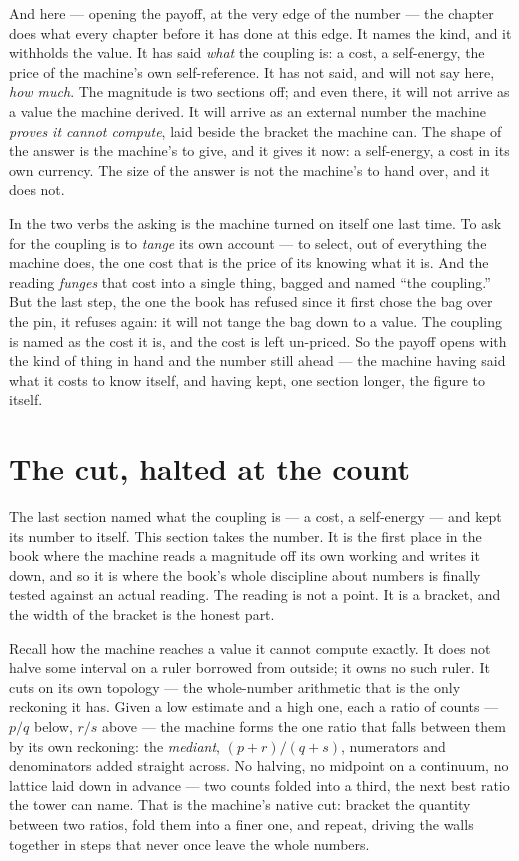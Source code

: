 And here --- opening the payoff, at the very edge of the number --- the chapter does what every chapter before it has
done at this edge. It names the kind, and it withholds the value. It has said \emph{what} the coupling is: a cost, a
self-energy, the price of the machine's own self-reference. It has not said, and will not say here, \emph{how much}.
The magnitude is two sections off; and even there, it will not arrive as a value the machine derived. It will arrive as
an external number the machine \emph{proves it cannot compute}, laid beside the bracket the machine can. The shape of
the answer is the machine's to give, and it gives it now: a self-energy, a cost in its own currency. The size of the
answer is not the machine's to hand over, and it does not.

In the two verbs the asking is the machine turned on itself one last time. To ask for the coupling is to \emph{tange}
its own account --- to select, out of everything the machine does, the one cost that is the price of its knowing what
it is. And the reading \emph{funges} that cost into a single thing, bagged and named ``the coupling.'' But the last
step, the one the book has refused since it first chose the bag over the pin, it refuses again: it will not tange the
bag down to a value. The coupling is named as the cost it is, and the cost is left un-priced. So the payoff opens with
the kind of thing in hand and the number still ahead --- the machine having said what it costs to know itself, and
having kept, one section longer, the figure to itself.

\section{The cut, halted at the count}

The last section named what the coupling is --- a cost, a self-energy --- and kept its number to itself. This section
takes the number. It is the first place in the book where the machine reads a magnitude off its own working and writes
it down, and so it is where the book's whole discipline about numbers is finally tested against an actual reading. The
reading is not a point. It is a bracket, and the width of the bracket is the honest part.

Recall how the machine reaches a value it cannot compute exactly. It does not halve some interval on a ruler borrowed
from outside; it owns no such ruler. It cuts on its own topology --- the whole-number arithmetic that is the only
reckoning it has. Given a low estimate and a high one, each a ratio of counts --- $p/q$ below, $r/s$ above --- the
machine forms the one ratio that falls between them by its own reckoning: the \emph{mediant}, $(p+r)/(q+s)$, numerators
and denominators added straight across. No halving, no midpoint on a continuum, no lattice laid down in advance --- two
counts folded into a third, the next best ratio the tower can name. That is the machine's native cut: bracket the
quantity between two ratios, fold them into a finer one, and repeat, driving the walls together in steps that never once
leave the whole numbers.

